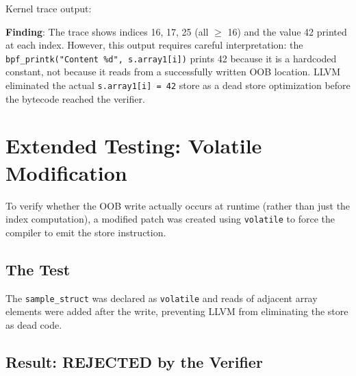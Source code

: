 \noindent
Kernel trace output:

\vspace{0.3cm}
\noindent
{}
\vspace{0.3cm}

\noindent
\textbf{Finding}: The trace shows indices 16, 17, 25 (all $\geq$ 16) and the value 42 printed at each index. However, this output requires careful interpretation: the \texttt{bpf\_printk("Content \%d", s.array1[i])} prints 42 because it is a hardcoded constant, not because it reads from a successfully written OOB location. LLVM eliminated the actual \texttt{s.array1[i] = 42} store as a dead store optimization before the bytecode reached the verifier.

\section{Extended Testing: Volatile Modification}

To verify whether the OOB write actually occurs at runtime (rather than just the index computation), a modified patch was created using \texttt{volatile} to force the compiler to emit the store instruction.

\subsection{The Test}

\noindent
The \texttt{sample\_struct} was declared as \texttt{volatile} and reads of adjacent array elements were added after the write, preventing LLVM from eliminating the store as dead code.

\subsection{Result: REJECTED by the Verifier}

